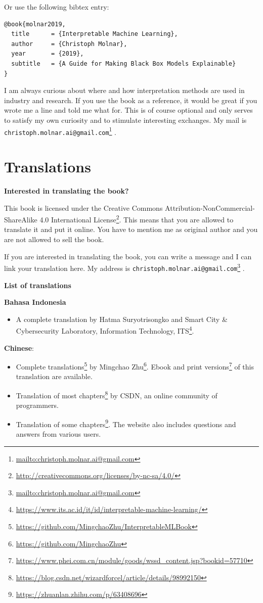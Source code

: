 \documentclass[
  12pt,
]{krantz}
\providecommand{\tightlist}{%
  \setlength{\itemsep}{0pt}\setlength{\parskip}{0pt}}
\renewcommand{\href}[2]{#2\footnote{\url{#1}}}
\begin{document}
Or use the following bibtex entry:

\begin{verbatim}
@book{molnar2019,
  title      = {Interpretable Machine Learning},
  author     = {Christoph Molnar},
  year       = {2019},
  subtitle   = {A Guide for Making Black Box Models Explainable}
}
\end{verbatim}

I am always curious about where and how interpretation methods are used in industry and research.
If you use the book as a reference, it would be great if you wrote me a line and told me what for.
This is of course optional and only serves to satisfy my own curiosity and to stimulate interesting exchanges.
My mail is \href{mailto:christoph.molnar.ai@gmail.com}{\nolinkurl{christoph.molnar.ai@gmail.com}} .

\hypertarget{translations}{%
\chapter{Translations}\label{translations}}

\textbf{Interested in translating the book?}

This book is licensed under the \href{http://creativecommons.org/licenses/by-nc-sa/4.0/}{Creative Commons Attribution-NonCommercial-ShareAlike 4.0 International License}.
This means that you are allowed to translate it and put it online.
You have to mention me as original author and you are not allowed to sell the book.

If you are interested in translating the book, you can write a message and I can link your translation here.
My address is \href{mailto:christoph.molnar.ai@gmail.com}{\nolinkurl{christoph.molnar.ai@gmail.com}} .

\textbf{List of translations}

\textbf{Bahasa Indonesia}

\begin{itemize}
\tightlist
\item
  \href{https://www.its.ac.id/it/id/interpretable-machine-learning/}{A complete translation by Hatma Suryotrisongko and Smart City \& Cybersecurity Laboratory, Information Technology, ITS}.
\end{itemize}

\textbf{Chinese}:

\begin{itemize}
\tightlist
\item
  \href{https://github.com/MingchaoZhu/InterpretableMLBook}{Complete translations} by \href{https://github.com/MingchaoZhu}{Mingchao Zhu}. \href{https://www.phei.com.cn/module/goods/wssd_content.jsp?bookid=57710}{Ebook and print versions} of this translation are available.
\item
  \href{https://blog.csdn.net/wizardforcel/article/details/98992150}{Translation of most chapters} by CSDN, an online community of programmers.
\item
  \href{https://zhuanlan.zhihu.com/p/63408696}{Translation of some chapters}. The website also includes questions and answers from various users.
\end{itemize}
\end{document}
